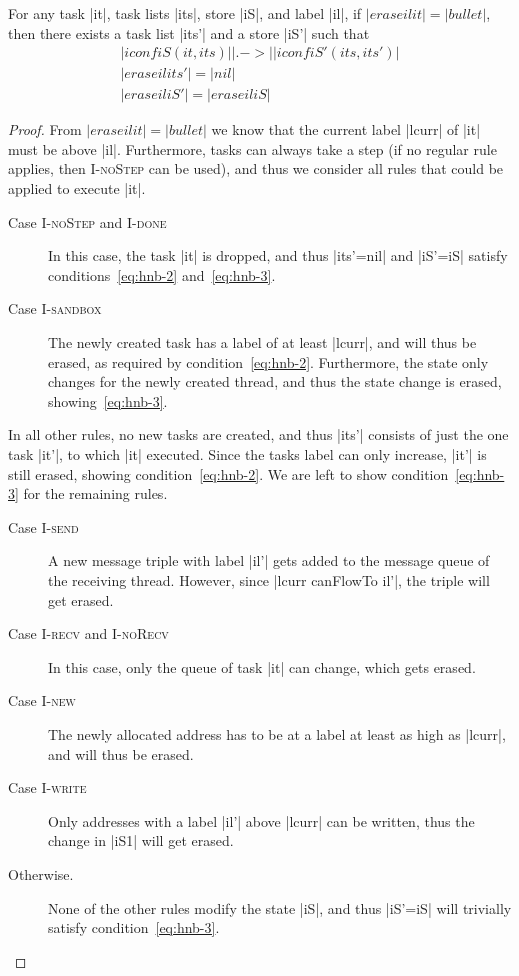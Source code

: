 \begin{lemma}
  \label{lemma:high-not-blocking}
  For any task |it|, task lists |its|, store |iS|, and label |il|, if
  $|erase il it|=|bullet|$, then there exists a task list
  |its'| and a store |iS'| such that
  \begin{align}
  |iconf iS (it, its)| |.->| |iconf iS' (its, its')| \label{eq:hnb-1} \\
  |erase il its'|=|nil| \label{eq:hnb-2}\\
  |erase il iS'|=|erase il iS| \label{eq:hnb-3}
  \end{align}
\end{lemma}
\begin{proof}
  From $|erase il it|=|bullet|$ we know that the current label |lcurr| of |it|
  must be above |il|.  Furthermore, tasks can always take a step (if no
  regular rule applies, then \textsc{I-noStep} can be used), and thus
  we consider all rules that could be applied to execute |it|.
  \begin{description}
    \item[Case \textsc{I-noStep} and \textsc{I-done}]
    In this case, the task |it| is dropped,
    and thus |its'=nil| and |iS'=iS| satisfy
    conditions~\eqref{eq:hnb-2} and~\eqref{eq:hnb-3}.
    \item[Case \textsc{I-sandbox}]
    The newly created task has a label of at least |lcurr|, and will thus be
    erased, as required by condition~\eqref{eq:hnb-2}.  Furthermore, the
    state only changes for the newly created thread, and thus the state
    change is erased, showing~\eqref{eq:hnb-3}.
  \end{description}
  In all other rules, no new tasks are created, and thus |its'| consists of just
  the one task |it'|, to which |it| executed.  Since the tasks label can
  only increase, |it'| is still erased, showing condition~\eqref{eq:hnb-2}.
  We are left to show condition~\eqref{eq:hnb-3} for the remaining rules.
  \begin{description}
    \item[Case \textsc{I-send}]
    A new message triple with label |il'| gets added to the message
    queue of the receiving thread.  However, since |lcurr canFlowTo il'|,
    the triple will get erased.
    \item[Case \textsc{I-recv} and \textsc{I-noRecv}]
    In this case, only the queue of
    task |it| can change, which gets erased.
    \item[Case \textsc{I-new}] The newly allocated address has to be at a
    label at least as high as |lcurr|, and will thus be erased.
    \item[Case \textsc{I-write}] Only addresses with a label |il'| above
    |lcurr| can be written, thus the change in |iS1| will get erased.
    \item[Otherwise.]  None of the other rules modify the state |iS|, and
    thus |iS'=iS| will trivially satisfy condition~\eqref{eq:hnb-3}.
  \end{description}
\end{proof}

